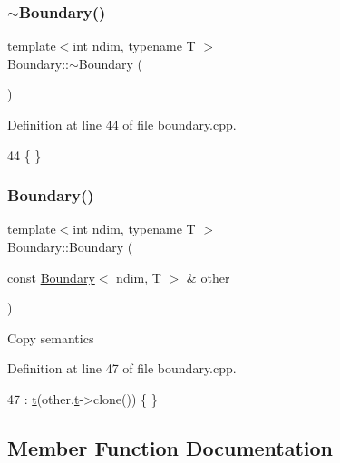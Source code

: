 \subsubsection{\texorpdfstring{$\sim$\+Boundary()}{~Boundary()}}
{\footnotesize\ttfamily template$<$int ndim, typename T $>$ \\
Boundary\+::$\sim$\+Boundary (\begin{DoxyParamCaption}{ }\end{DoxyParamCaption})}



Definition at line 44 of file boundary.\+cpp.


\begin{DoxyCode}
44 \{ \}
\end{DoxyCode}
\hypertarget{classshark_1_1ndim_1_1_boundary_a530ae26f4011eaf93935de5a357ea22a}{}\label{classshark_1_1ndim_1_1_boundary_a530ae26f4011eaf93935de5a357ea22a} 
\subsubsection{\texorpdfstring{Boundary()}{Boundary()}\hspace{0.1cm}{\footnotesize\ttfamily [3/3]}}
{\footnotesize\ttfamily template$<$int ndim, typename T $>$ \\
Boundary\+::\+Boundary (\begin{DoxyParamCaption}\item[{const \hyperlink{classshark_1_1ndim_1_1_boundary}{Boundary}$<$ ndim, T $>$ \&}]{other }\end{DoxyParamCaption})}

Copy semantics 

Definition at line 47 of file boundary.\+cpp.


\begin{DoxyCode}
47 : \hyperlink{classshark_1_1ndim_1_1_boundary_a16fdfa33d88480b4127ff36c1f1a2ce7}{t}(other.\hyperlink{classshark_1_1ndim_1_1_boundary_a16fdfa33d88480b4127ff36c1f1a2ce7}{t}->clone()) \{ \}
\end{DoxyCode}


\subsection{Member Function Documentation}
\hypertarget{classshark_1_1ndim_1_1_boundary_afe55524d0fe2276ec019549ab88fb1a3}{}\label{classshark_1_1ndim_1_1_boundary_afe55524d0fe2276ec019549ab88fb1a3} 
